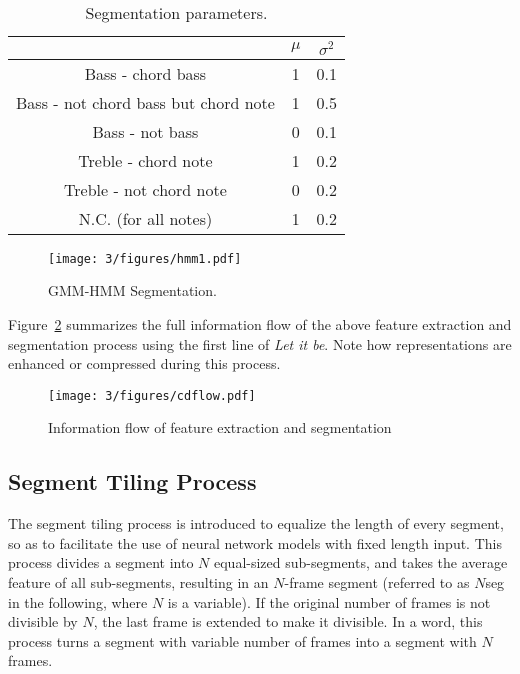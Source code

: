 \begin{table}
\caption{Segmentation parameters.}
\centering
\footnotesize
\begin{tabular}{|c|c|c|} \hline
      & $\mu$ & $\sigma^2$ \\ \hline
 Bass - chord bass & 1 & 0.1 \\ \hline
 Bass - not chord bass but chord note & 1 & 0.5  \\ \hline
 Bass - not bass & 0 & 0.1 \\ \hline
 Treble - chord note & 1 & 0.2  \\ \hline
 Treble - not chord note & 0 & 0.2 \\ \hline
 N.C. (for all notes)  & 1 & 0.2  \\ \hline
\end{tabular}
\label{tab:3-gaussian}
\end{table}

\begin{figure}[htb]
\centering
\texttt{[image: 3/figures/hmm1.pdf]}
\caption{GMM-HMM Segmentation.}
\label{fig:3-hmm1}
\end{figure}

Figure~\ref{fig:3-cdflow} summarizes the full information flow of the above feature extraction and segmentation process using the first line of {\it Let it be}. Note how representations are enhanced or compressed during this process.
\begin{figure}[h]
\centering
\texttt{[image: 3/figures/cdflow.pdf]}
\caption{Information flow of feature extraction and segmentation}
\label{fig:3-cdflow}
\end{figure}

\subsection{Segment Tiling Process} \label{sec:3-seg-tile}

The segment tiling process is introduced to equalize the length of every segment, so as to facilitate the use of neural network models with fixed length input. This process divides a segment into $N$ equal-sized sub-segments, and takes the average feature of all sub-segments, resulting in an $N$-frame segment (referred to as $N$seg in the following, where $N$ is a variable). If the original number of frames is not divisible by $N$, the last frame is extended to make it divisible. In a word, this process turns a segment with variable number of frames into a segment with $N$ frames.

